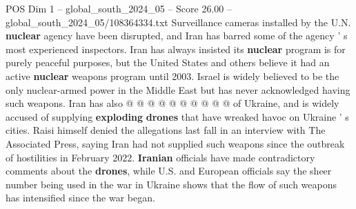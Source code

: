 \begin{textsample}{POS Dim 1 – global\_south\_2024\_05 – Score 26.00 – global\_south\_2024\_05/108364334.txt}
Surveillance cameras installed by the U.N. \textbf{nuclear} agency have been disrupted, and Iran has barred some of the agency ' s most experienced inspectors.
Iran has always insisted its \textbf{nuclear} program is for purely peaceful purposes, but the United States and others believe it had an active \textbf{nuclear} weapons program until 2003.
Israel is widely believed to be the only nuclear-armed power in the Middle East but has never acknowledged having such weapons.
Iran has also @ @ @ @ @ @ @ @ @ @ of Ukraine, and is widely accused of supplying \textbf{exploding} \textbf{drones} that have wreaked havoc on Ukraine ' s cities.
Raisi himself denied the allegations last fall in an interview with The Associated Press, saying Iran had not supplied such weapons since the outbreak of hostilities in February 2022. \textbf{Iranian} officials have made contradictory comments about the \textbf{drones}, while U.S. and European officials say the sheer number being used in the war in Ukraine shows that the flow of such weapons has intensified since the war began.

\end{textsample}
